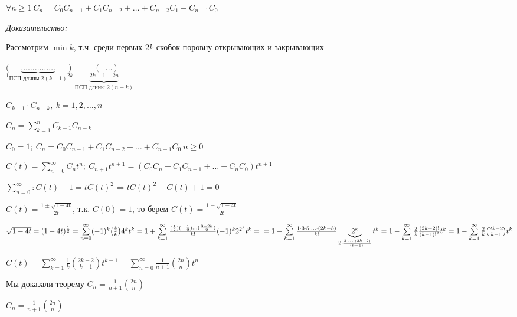 \documentclass[12pt]{article}
\begin{document}
\begin{propos}{}
    $\forall n \geq 1\ C_n = C_0C_{n - 1} + C_1C_{n -2} + \ldots + C_{n - 2}C_1 + C_{n - 1}C_0$
\end{propos}

\textit{Доказательство:}

Рассмотрим $\min k$, т.ч. среди первых $2k$ скобок поровну открывающих и закрывающих 

$\underset{1}{(}\underbrace{\ldots\ldots\ldots\ldots\ldots}_{\text{ПСП длины }2(k - 1)}\underset{2k}{)}\ \underbrace{\underset{2k + 1}{(} \ldots \underset{2n}{)}}_{\text{ПСП длины }2(n - k)}$

$C_{k - 1} \cdot C_{n - k},\ k = 1, 2, \ldots, n$

$C_n = \sum\limits_{k = 1}^n C_{k - 1}C_{n - k}$

\begin{nota}{}
    $C_0 = 1;\ C_n = C_0C_{n - 1} + C_1C_{n - 2} + \ldots + C_{n - 1}C_0\ n \geq 0$

    $C(t) = \sum\limits_{n = 0}^\infty C_nt^n;\ C_{n + 1}t^{n + 1} = (C_0C_n + C_1C_{n - 1} + \ldots + C_nC_0)t^{n + 1}$

    $\sum\limits_{n = 0}^\infty : C(t) - 1 = tC(t)^2 \Leftrightarrow t C(t)^2 - C(t) + 1 = 0$

    $C(t) = \frac{1 \pm \sqrt{1 - 4t}}{2t}$, т.к. $C(0) = 1$, то берем $C(t) = \frac{1 - \sqrt{1 - 4t}}{2t}$

    $\sqrt{1 - 4t} = (1 - 4t)^\frac{1}{2} = \sum\limits_{n = 0}^\infty (-1)^k {\frac{1}{2} \choose k}4^kt^k = 1 + \sum\limits_{k = 1}^\infty \frac{(\frac{1}{2})(- \frac{1}{2}) \ldots (\frac{3 - 2k}{2})}{k!}(-1)^k2^{2^k}t^k = \\
    = 1 - \sum\limits_{k = 1}^\infty \frac{1 \cdot 3 \cdot 5 \cdot \ldots \cdot (2k - 3)}{k!}\underbrace{2^k}_{2 \cdot \frac{2 \cdot \ldots \cdot (2k - 2)}{(k - 1)!}}t^k = 1 - \sum\limits_{k = 1}^\infty \frac{2}{k} \frac{(2k - 2)!}{(k - 1)!^2}t^k = 1 - \sum\limits_{k = 1}^\infty \frac{2}{k} {2k - 2 \choose k - 1}t^k$

    $C(t) = \sum\limits_{k = 1}^\infty \frac{1}{k} {2k - 2 \choose k - 1}t^{k - 1} = \sum\limits_{n = 0}^\infty \frac{1}{n + 1}{2n \choose n}t^n$

    Мы доказали теорему $C_n = \frac{1}{n + 1}{2n \choose n}$
\end{nota}

\begin{theo}{}
    $C_n = \frac{1}{n + 1}{2n \choose n}$
\end{theo}
\end{document}
